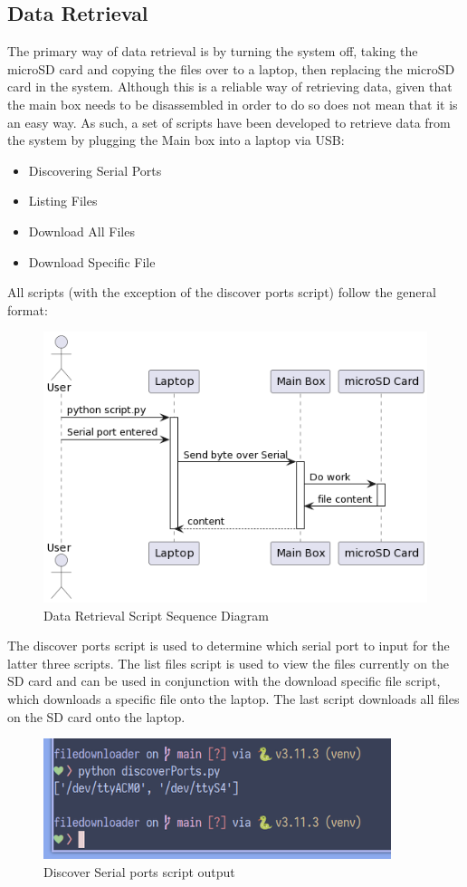 \subsection{Data Retrieval}
The primary way of data retrieval is by turning the system off, taking the microSD card and copying the files over to a laptop, then replacing the microSD card in the system.
Although this is a reliable way of retrieving data, given that the main box needs to be disassembled in order to do so does not mean that it is an easy way.
As such, a set of scripts have been developed to retrieve data from the system by plugging the Main box into a laptop via USB:
\begin{itemize}
    \item Discovering Serial Ports
    \item Listing Files
    \item Download All Files
    \item Download Specific File
\end{itemize}
All scripts (with the exception of the discover ports script) follow the general format:
\begin{figure}[H]
    \centering
    \includegraphics[width=5in]{images/dataretrieval-seq.png}
    \caption{Data Retrieval Script Sequence Diagram}
    \label{fig:drssd}
\end{figure}
The discover ports script is used to determine which serial port to input for the latter three scripts.
The list files script is used to view the files currently on the SD card and can be used in conjunction with the download specific file script, which downloads a specific file onto the laptop.
The last script downloads all files on the SD card onto the laptop.
\begin{figure}[H]
    \centering
    \includegraphics[width=4in]{images/discover.png}
    \caption{Discover Serial ports script output}
    \label{fig:dspsoi}
\end{figure}
